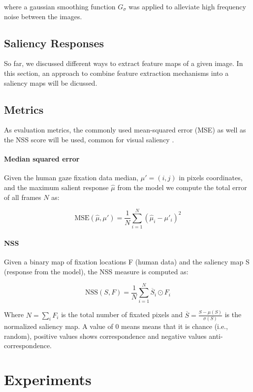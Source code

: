 \documentclass[a4paper,twocolumn,10pt]{article}
\begin{document}
where a gaussian smoothing function $G_\sigma$ was applied to alleviate high frequency noise between the images.

\subsection{Saliency Responses}

So far, we discussed different ways to extract feature maps of a given image.
In this section, an approach to combine feature extraction mechanisms into a saliency maps will be dicussed.

\subsection{Metrics}

As evaluation metrics, the commonly used mean-squared error (MSE) as well as the NSS score will be used, common for visual saliency \cite{Bylinskii2016,Bylinskii2015,Borji2015}.

\paragraph{Median squared error}

Given the human gaze fixation data median, $\mu' = (i, j)$ in
pixels coordinates, and the maximum salient response $\hat{\mu}$ from the model we
compute the total error of all frames $N$ as:

$$
\text{MSE}(\hat{\mu}, \mu') = \frac{1}{N} \sum_{i = 1}^N (\hat{\mu}_i - \mu'_i)^2
$$

\paragraph{NSS}

Given a binary map of fixation locations F (human data) and the saliency map S
(response from the model), the NSS measure is computed as:

$$
\text{NSS}(S,F) = \frac{1}{N} \sum_{i = 1}^N \overline{S}_i \odot F_i
$$

Where $N = \sum_i F_i$ is the total number of fixated pixels and $\overline{S} = \frac{S - \mu(S)}{\sigma(S)}$ is the normalized saliency map.
A value of 0 means means that it is chance (i.e., random), positive values shows correspondence and
negative values anti-correspondence.


\section{Experiments}
\end{document}
